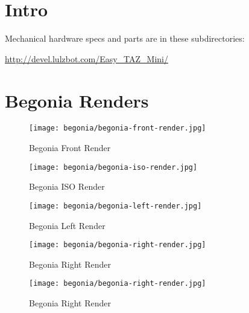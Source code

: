 %
%
%
%
%

\section{Intro}
Mechanical hardware specs and parts are in these subdirectories:

\url{http://devel.lulzbot.com/Easy_TAZ_Mini/}

\section{Begonia Renders}

\begin{figure}[H]
\centering
\texttt{[image: begonia/begonia-front-render.jpg]}
\caption{Begonia Front Render}
\label{fig:begfrontrender}
\end{figure}

\begin{figure}[H]
\centering
\texttt{[image: begonia/begonia-iso-render.jpg]}
\caption{Begonia ISO Render}
\label{fig:begisorender}
\end{figure}

\begin{figure}[H]
\centering
\texttt{[image: begonia/begonia-left-render.jpg]}
\caption{Begonia Left Render}
\label{fig:begleftrender}
\end{figure}

\begin{figure}[H]
\centering
\texttt{[image: begonia/begonia-right-render.jpg]}
\caption{Begonia Right Render}
\label{fig:begrightrender}
\end{figure}

\begin{figure}[H]
\centering
\texttt{[image: begonia/begonia-right-render.jpg]}
\caption{Begonia Right Render}
\label{fig:begrightrender}
\end{figure}

